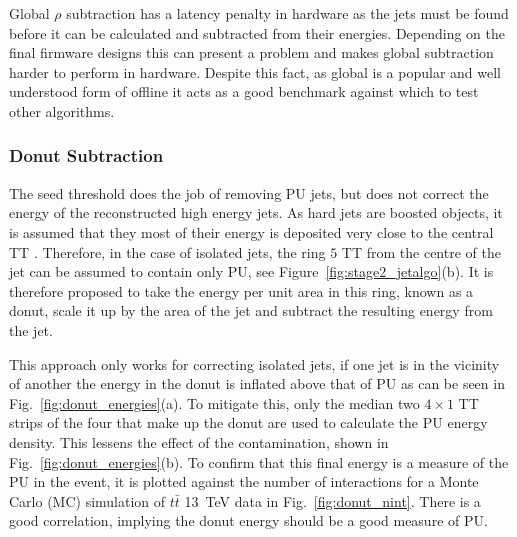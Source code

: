Global $\rho$ subtraction has a latency penalty in hardware as
the jets must be found before it can be calculated and subtracted from
their energies. Depending on the final firmware designs this can
present a problem and makes global \rho subtraction harder to perform
in hardware. Despite this fact, as global \rho is a popular and well
understood form of offline \PUS it acts as a good benchmark against
which to test other algorithms.

\subsubsection{Donut Subtraction}

The seed threshold does the job of removing PU jets, but does not
correct the energy of the reconstructed high energy jets. As hard jets
are boosted objects, it is assumed that they most of their energy is
deposited very close to the central TT \cite{JetProfile_pileup}.
Therefore, in the case of isolated jets, the ring $5$ TT from the
centre of the jet can be assumed to contain only PU, see
Figure~\ref{fig:stage2_jetalgo}(b). It is therefore proposed to take
the energy per unit area in this ring, known as a donut, scale it up
by the area of the jet and subtract the resulting energy from the jet.

This approach only works for correcting isolated jets, if one jet is
in the vicinity of another the energy in the donut is inflated above
that of PU as can be seen in Fig.~\ref{fig:donut_energies}(a). To
mitigate this, only the median two $4\times1$ TT strips of the four
that make up the donut are used to calculate the PU energy density.
This lessens the effect of the contamination, shown in
Fig.~\ref{fig:donut_energies}(b). To confirm that this final energy is
a measure of the PU in the event, it is plotted against the number of
interactions for a Monte Carlo (MC) simulation of $t\bar{t}$ 13~TeV
data in Fig.~\ref{fig:donut_nint}. There is a good correlation,
implying the donut energy should be a good measure of PU.

